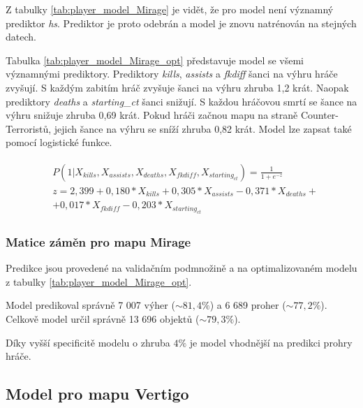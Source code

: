 {\color{red}
Z tabulky \ref{tab:player_model_Mirage} je vidět, že pro model není významný prediktor \textit{hs}. Prediktor je proto odebrán a model je znovu natrénován na stejných datech.
}



{\color{red}
Tabulka \ref{tab:player_model_Mirage_opt} představuje model se všemi významnými prediktory. Prediktory \textit{kills}, \textit{assists} a \textit{fkdiff} šanci na výhru
hráče zvyšují. S každým zabitím hráč zvyšuje šanci na výhru zhruba 1,2 krát. Naopak prediktory \textit{deaths} a \textit{starting\_ct} šanci snižují. S každou hráčovou smrtí
se šance na výhru snižuje zhruba 0,69 krát. Pokud hráči začnou mapu na straně Counter-Terroristů, jejich šance na výhru se sníží zhruba 0,82 krát. 
Model lze zapsat také pomocí logistické funkce.
}

\begin{align}
    \begin{split}
        &P(1 | X_{kills}, X_{assists}, X_{deaths}, X_{fkdiff}, X_{starting_{ct}}) = \frac{1}{1 + e^{-z}} \\
        &z = 2,399 + 0,180*X_{kills} + 0,305*X_{assists} - 0,371*X_{deaths} + \\
        &+ 0,017*X_{fkdiff} - 0,203*X_{starting_{ct}}
    \end{split}
    \label{eq:player_funkce_Mirage}
\end{align}

\subsubsection{Matice záměn pro mapu Mirage}
Predikce jsou provedené na validačním podmnožině a na optimalizovaném modelu z tabulky \ref{tab:player_model_Mirage_opt}.



Model predikoval správně 7 007 výher 
{\color{red}
($\sim 81,4\%$)
}
a 6 689 proher
{\color{red}
($\sim 77,2\%$). Celkově model určil správně 13 696 objektů ($\sim 79,3\%$).
}



{\color{red}
Díky vyšší specificitě modelu o zhruba $4\%$ je model vhodnější na predikci prohry hráče.
}

\subsection{Model pro mapu Vertigo}

